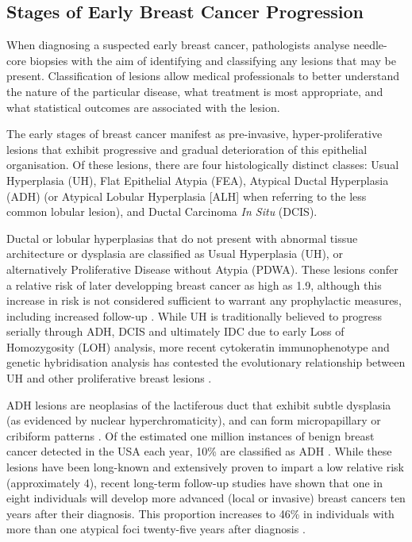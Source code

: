 \subsection{Stages of Early Breast Cancer Progression}
When diagnosing a suspected early breast cancer, pathologists analyse needle-core biopsies with the aim of identifying and classifying any lesions that may be present. Classification of lesions allow medical professionals to better understand the nature of the particular disease, what treatment is most appropriate, and what statistical outcomes are associated with the lesion.\par

The early stages of breast cancer manifest as pre-invasive, hyper-proliferative lesions that exhibit progressive and gradual deterioration of this epithelial organisation. Of these lesions, there are four histologically distinct classes: Usual Hyperplasia (UH), Flat Epithelial Atypia (FEA), Atypical Ductal Hyperplasia (ADH) (or Atypical Lobular Hyperplasia [ALH] when referring to the less common lobular lesion), and Ductal Carcinoma {\it In Situ} (DCIS).\par

Ductal or lobular hyperplasias that do not present with abnormal tissue architecture or dysplasia are classified as Usual Hyperplasia (UH), or alternatively Proliferative Disease without Atypia (PDWA). These lesions confer a relative risk of later developping breast cancer as high as 1.9, although this increase in risk is not considered sufficient to warrant any prophylactic measures, including increased follow-up \citep{mommers2001}. While UH is traditionally believed to progress serially through ADH, DCIS and ultimately IDC due to early Loss of Homozygosity (LOH) analysis, more recent cytokeratin immunophenotype and genetic hybridisation analysis has contested the evolutionary relationship between UH and other proliferative breast lesions \citep{oconnell1994, boecker2002}.\par

ADH lesions are neoplasias of the lactiferous duct that exhibit subtle dysplasia (as evidenced by nuclear hyperchromaticity), and can form micropapillary or cribiform patterns \citep{page1959,dion2016}. Of the estimated one million instances of benign breast cancer detected in the USA each  year, 10\% are classified as ADH \citep{simpson2009}. While  these lesions have been long-known and extensively proven to impart a low relative risk (approximately 4), recent long-term follow-up studies have shown that one in eight individuals will develop more advanced (local or invasive) breast cancers ten years after their diagnosis. This proportion increases to 46\% in individuals with more than one atypical foci twenty-five years after diagnosis \citep{hartmann2015}.\par

